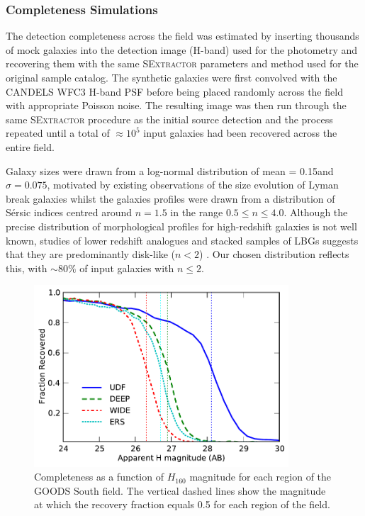 \subsubsection{Completeness Simulations}\label{smf-sec:completeness}
The detection completeness across the field was estimated by inserting thousands of mock galaxies into the detection image (H-band) used for the photometry and recovering them with the same \textsc{SExtractor} parameters and method used for the original sample catalog. The synthetic galaxies were first convolved with the CANDELS WFC3 H-band PSF before being placed randomly across the field with appropriate Poisson noise. The resulting image was then run through the same \textsc{SExtractor} procedure as the initial source detection and the process repeated until a total of $\approx  10^{5}$ input galaxies had been recovered across the entire field. 

Galaxy sizes were drawn from a log-normal distribution of mean = 0.15\arcsec and $\sigma = 0.075$, motivated by existing observations of the size evolution of Lyman break galaxies \citep{2004ApJ...600L.107F,2010ApJ...709L..21O,2011A&A...532A..33G,Huang:2013kb} whilst the galaxies profiles were drawn from a distribution of S\'{e}rsic indices centred around $n=1.5$ in the range $0.5 \le n \le 4.0$. Although the precise distribution of morphological profiles for high-redshift galaxies is not well known, studies of lower redshift analogues and stacked samples of LBGs suggests that they are predominantly disk-like ($n < 2$) \citep{Ravindranath:2006ie,Hathi:2007fh}. Our chosen distribution reflects this, with $\sim 80\%$ of input galaxies with $n \leq 2$.

\begin{figure}
\centering
\includegraphics[width=95mm]{plots/fig3.pdf}

\caption[Completeness as a function of $H_{160}$ magnitude for each region of the GOODS South field.]{Completeness as a function of $H_{160}$ magnitude for each region of the GOODS South field. The vertical dashed lines show the magnitude at which the recovery fraction equals 0.5 for each region of the field.}
\label{smf-fig:completeness}
\end{figure}

